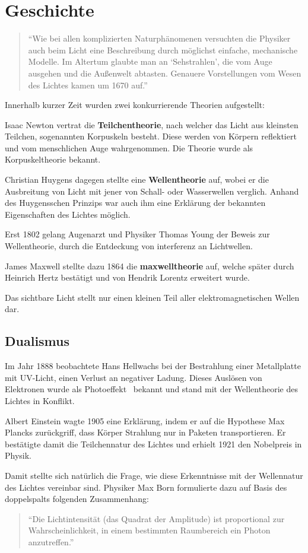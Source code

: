 \section{Geschichte}
\begin{quote}
\enquote{Wie bei allen komplizierten Naturphänomenen versuchten die Physiker auch beim Licht eine Beschreibung durch möglichst einfache, mechanische Modelle. Im Altertum glaubte man an \enquote{Sehstrahlen}, die vom Auge ausgehen und die Außenwelt abtasten. Genauere Vorstellungen vom Wesen des Lichtes kamen um 1670 auf.} \cite[S. 221]{physik1}
\end{quote}

Innerhalb kurzer Zeit wurden zwei konkurrierende Theorien aufgestellt:
\begin{outline}
	\1 Isaac Newton vertrat die \textbf{Teilchentheorie}, nach welcher das Licht aus kleinsten Teilchen, sogenannten Korpuskeln besteht. Diese werden von Körpern reflektiert und vom menschlichen Auge wahrgenommen. Die Theorie wurde als Korpuskeltheorie bekannt.
	
	\1 Christian Huygens dagegen stellte eine \textbf{Wellentheorie} auf, wobei er die Ausbreitung von Licht mit jener von Schall- oder Wasserwellen verglich. Anhand des Huygensschen Prinzips war auch ihm eine Erklärung der bekannten Eigenschaften des Lichtes möglich.
\end{outline}

Erst 1802 gelang Augenarzt und Physiker Thomas Young der Beweis zur Wellentheorie, durch die Entdeckung von \gls{interferenz} an Lichtwellen.

James Maxwell stellte dazu 1864 die \textbf{\gls{maxwelltheorie}} auf, welche später durch Heinrich Hertz bestätigt und von Hendrik Lorentz erweitert wurde.

Das sichtbare Licht stellt nur einen kleinen Teil aller elektromagnetischen Wellen dar.

\subsection{Dualismus}
Im Jahr 1888 beobachtete Hans Hellwachs bei der Bestrahlung einer Metallplatte mit UV-Licht, einen Verlust an negativer Ladung. Dieses Auslösen von Elektronen wurde als Photoeffekt~%
bekannt und stand mit der Wellentheorie des Lichtes in Konflikt.

Albert Einstein wagte 1905 eine Erklärung, indem er auf die Hypothese Max Plancks zurückgriff, dass Körper Strahlung nur in Paketen transportieren. Er bestätigte damit die Teilchennatur des Lichtes und erhielt 1921 den Nobelpreis in Physik.

Damit stellte sich natürlich die Frage, wie diese Erkenntnisse mit der Wellennatur des Lichtes vereinbar sind. Physiker Max Born formulierte dazu auf Basis des \glspl{doppelspalt} folgenden Zusammenhang:
\begin{quote}
\enquote{Die Lichtintensität (das Quadrat der Amplitude) ist proportional zur Wahrscheinlichkeit, in einem bestimmten Raumbereich ein Photon anzutreffen.} \cite[S. 183]{physik2}
\end{quote}